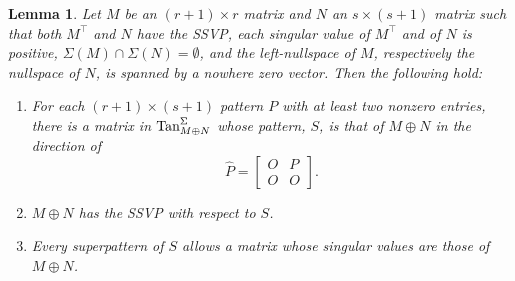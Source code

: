 \documentclass[preprint,12pt]{elsarticle}
\newcommand{\trans  }{^\top}
\newtheorem{lemma}[theorem]{Lemma}
\begin{document}
\begin{lemma}
\label{singsum}
Let $M$ be an $(r+1)\times r$ matrix and $N$ an $s\times (s+1)$ matrix
such that both $M\trans$ and $N$ have the SSVP, each singular value of $M\trans$ 
and of $N$ is positive,  $\Sigma(M) \cap \Sigma(N)= \emptyset$, and the left-nullspace of $M$, respectively the nullspace of $N$, is spanned by a nowhere zero vector. 
Then the following hold:
\begin{enumerate}
    \item[\rm (a)] For each $(r+1) \times (s+1)$  pattern $P$ with at least 
     two nonzero entries, there is a matrix in 
$\mbox{\rm Tan}^{\Sigma}_{M\oplus N}$
     whose pattern, $S$, is that of $M\oplus N$ in the direction of
     \[
     \widehat{P}=
     \left[ \begin{array}{c|c} O & P \\ \hline O & O \end{array} \right]. 
     \] 
    \item[\rm (b)] $M\oplus N$ has the SSVP with respect to $S$.
    \item[\rm (c)] Every superpattern of $S$
    allows a matrix whose singular values are those of $M \oplus N$. 
\end{enumerate}
\end{lemma}
\end{document}
